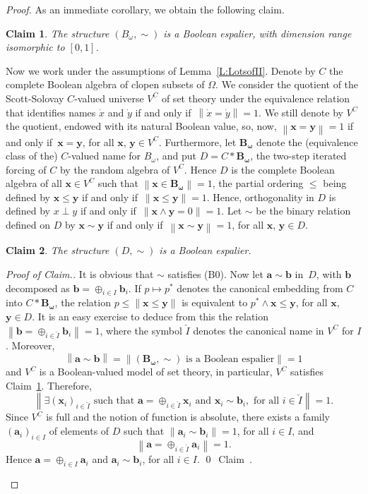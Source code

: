 \documentclass[psamsfonts,reqno]{memo-l}
\theoremstyle{plain}
\newtheorem{claim}{Claim}
\theoremstyle{definition}
\theoremstyle{remark}
\newcommand{\qedc}{{\qed}~{\rm Claim~{\theclaim}.}}
\newenvironment{cproof}
{\begin{proof}[Proof of Claim.]}
{\qedc\renewcommand{\qed}{}\end{proof}}
\numberwithin{equation}{section}
\renewcommand{\iff}{if and only if}
\newcommand{\Bo}{B_{\omega}}
\newcommand{\lBo}{\boldsymbol{B_{\omega}}}
\newcommand{\la}{\boldsymbol{a}}
\newcommand{\lb}{\boldsymbol{b}}
\newcommand{\lx}{\boldsymbol{x}}
\newcommand{\ly}{\boldsymbol{y}}
\newcommand{\dx}{\dot{x}}
\newcommand{\dy}{\dot{y}}
\newcommand{\bv}[1]{\left\|#1\right\|}
\begin{document}
\begin{proof}
As an immediate corollary, we obtain the following claim.

\begin{claim}\label{Cl:2}
The structure $(\Bo,\sim)$ is a Boolean
espalier, with dimension
range isomorphic to $[0,1]$.
\end{claim}

Now we work under the assumptions of Lemma~\ref{L:LotsofII}. Denote by $C$
the complete Boolean algebra
of clopen subsets of $\Omega$. We consider the
quotient of the Scott-Solovay $C$-valued universe $V^C$
of set theory under the equivalence relation that identifies names $\dx$ and
$\dy$ \iff\
$\bv{\dx=\dy}=1$. We still denote by $V^C$ the quotient, endowed with its
natural Boolean value, so, now, $\bv{\lx=\ly}=1$ \iff\ $\lx=\ly$, for all
$\lx$, $\ly\in V^C$. Furthermore, let $\lBo$\index{bzzlo@$\lBo$|ii}
denote the (equivalence
class of the) $C$-valued name for $\Bo$, and put $D=C*\lBo$, the two-step
iterated forcing of $C$ by the random algebra of $V^C$. Hence $D$ is the
complete Boolean algebra
of all $\lx\in V^C$ such that $\bv{\lx\in\lBo}=1$,
the partial ordering $\leq$ being defined by $\lx\leq\ly$ \iff\
$\bv{\lx\leq\ly}=1$. Hence, orthogonality in $D$ is defined by $x\perp y$
\iff\ $\bv{\lx\wedge\ly=0}=1$. Let $\sim$ be the binary relation defined on
$D$ by $\lx\sim\ly$ \iff\ $\bv{\lx\sim\ly}=1$, for all $\lx$, $\ly\in D$.

\begin{claim}\label{Cl:3}
The structure $(D,\sim)$ is a Boolean espalier.
\end{claim}

\begin{cproof}
It is obvious that $\sim$ satisfies (B0). Now let
$\la\sim\lb$ in~$D$, with $\lb$ decomposed as $\lb=\oplus_{i\in I}\lb_i$.
If $p\mapsto p^*$ denotes the canonical embedding from $C$ into $C*\lBo$, the
relation $p\leq\bv{\lx\leq\ly}$ is equivalent to $p^*\wedge\lx\leq\ly$, for
all $\lx$, $\ly\in D$. It is an easy exercise to deduce from this the relation
$\bv{\lb=\oplus_{i\in\check I}\lb_i}=1$, where the symbol $\check I$ denotes
the canonical name in $V^C$ for $I$. Moreover,
   \[
   \bv{\la\sim\lb}=\bv{(\lBo,\sim)\text{ is a Boolean espalier}}=1
   \]
and $V^C$ is a Boolean-valued model of
set theory, in particular, $V^C$\index{VzzVB@$V^B$} satisfies
Claim~\ref{Cl:2}. Therefore,
   \[
   \bv{\exists(\lx_i)_{i\in\check I}\text{ such that }
   \la=\oplus_{i\in\check I}\lx_i\text{ and }\lx_i\sim\lb_i,\text{ for all }
   i\in\check I}=1.
   \]
Since $V^C$ is full and the notion of function is
absolute, there exists a family $(\la_i)_{i\in I}$ of elements of $D$ such
that
$\bv{\la_i\sim\lb_i}=1$, for all $i\in I$, and
   \[
   \bv{\la=\oplus_{i\in\check I}\la_i}=1.
   \]
Hence $\la=\oplus_{i\in I}\la_i$ and $\la_i\sim\lb_i$, for all $i\in I$.
\end{cproof}


\end{proof}
\end{document}
